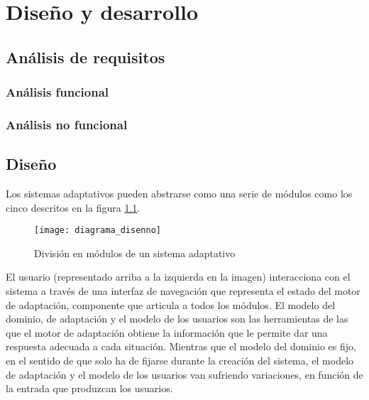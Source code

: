 \chapter{Diseño y desarrollo\label{sec:disenhoYDesarrollo}}



\section{Análisis de requisitos}

\subsection{Análisis funcional}

\subsection{Análisis no funcional}


\section{Diseño}

Los sistemas adaptativos pueden abstrarse como una serie de módulos como los cinco descritos en la figura \ref{fig:diagrama_disenno}. 

\begin{figure}[htp!]
	\centering
	\texttt{[image: diagrama\_disenno]}
	\caption{División en módulos de un sistema adaptativo}
	\label{fig:diagrama_disenno}
\end{figure}

El usuario (representado arriba a la izquierda en la imagen) interacciona con el sistema a través de una interfaz de navegación que representa el estado del motor de adaptación, componente que articula a todos los módulos. El modelo del dominio, de adaptación y el modelo de los usuarios son las herramientas de las que el motor de adaptación obtiene la información que le permite dar una respuesta adecuada a cada situación. Mientras que el modelo del dominio es fijo, en el sentido de que solo ha de fijarse durante la creación del sistema, el modelo de adaptación y el modelo de los usuarios van sufriendo variaciones, en función de la entrada que produzcan los usuarios.

